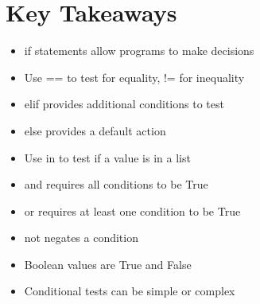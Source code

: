 \section*{Key Takeaways}
\begin{itemize}
    \item if statements allow programs to make decisions
    \item Use == to test for equality, != for inequality
    \item elif provides additional conditions to test
    \item else provides a default action
    \item Use in to test if a value is in a list
    \item and requires all conditions to be True
    \item or requires at least one condition to be True
    \item not negates a condition
    \item Boolean values are True and False
    \item Conditional tests can be simple or complex
\end{itemize} 